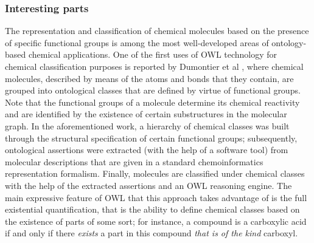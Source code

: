 \documentclass[10pt]{bmc_article}
\newenvironment{bmcformat}{\baselineskip20pt\sloppy\setboolean{publ}{false}}{\baselineskip20pt\sloppy}
\begin{document}
\begin{bmcformat}
% 
% 
%  



\subsubsection*{Interesting parts}


The representation and classification of chemical molecules based on the presence of specific functional groups is among the most well-developed areas of ontology-based chemical applications. One of the first uses of OWL technology for chemical classification purposes is reported by Dumontier et al \cite{dumontier2007}, where chemical molecules, described by means of the atoms and bonds that they contain, are grouped into ontological classes that are defined by virtue of functional groups. Note that the functional groups of a molecule determine its chemical reactivity and are identified by the existence of certain substructures in the molecular graph. In the aforementioned work, a hierarchy of chemical classes was built through the structural specification of certain functional groups; subsequently, ontological assertions were extracted (with the help of a software tool) from molecular descriptions that are given in a standard chemoinformatics representation formalism. Finally, molecules are classified under chemical classes with the help of the extracted assertions and an OWL reasoning engine. The main expressive feature of OWL that this approach takes advantage of is the full existential quantification, that is the ability to define chemical classes based on the existence of parts of some sort; for instance, a compound is a carboxylic acid if and only if there \emph{exists} a part in this compound \emph{that is of the kind} carboxyl.


\end{bmcformat}
\end{document}
